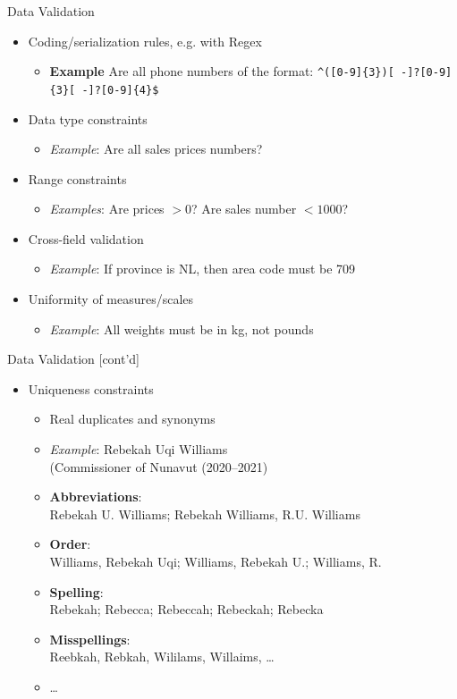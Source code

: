 \documentclass[ignorenonframetext,xcolor=x11names]{beamer}
\begin{document}
\begin{frame}[label=full]{Data Validation}
\begin{itemize}
 \item Coding/serialization rules, e.g. with Regex 
 \begin{itemize}
   \item \textbf{Example} Are all phone numbers of the format: 
   \colorbox{code}{\texttt{\footnotesize \Verb_^([0-9]{3})[ -]?[0-9]{3}[ -]?[0-9]{4}$_}}
 \end{itemize}
 \item Data type constraints
 \begin{itemize}
   \item \emph{Example}: Are all sales prices numbers?
 \end{itemize}
 \item Range constraints
 \begin{itemize}
   \item \emph{Examples}: Are prices $> 0$? Are sales number $< 1000$?
 \end{itemize}
 \item Cross-field validation
 \begin{itemize}
   \item \emph{Example}: If province is NL, then area code must be 709
 \end{itemize}
 \item Uniformity of measures/scales
 \begin{itemize}
   \item \emph{Example}: All weights must be in kg, not pounds
 \end{itemize}
\end{itemize}
\end{frame}

\begin{frame}[label=full]{Data Validation \small [cont'd]}
\begin{itemize}
 \item Uniqueness constraints
 \begin{itemize}
   \item Real duplicates and synonyms
   \item \emph{Example}: Rebekah Uqi Williams \\ (Commissioner of Nunavut (2020--2021)
   \item \textbf{Abbreviations}: \\ Rebekah U. Williams; Rebekah Williams, R.U. Williams
   \item \textbf{Order}: \\ Williams, Rebekah Uqi; Williams, Rebekah U.; Williams, R.
   \item \textbf{Spelling}: \\ Rebekah; Rebecca; Rebeccah; Rebeckah; Rebecka
   \item \textbf{Misspellings}: \\ Reebkah, Rebkah, Wililams, Willaims, \ldots
   \item \ldots
 \end{itemize}
\end{itemize}
\end{frame}
\end{document}
